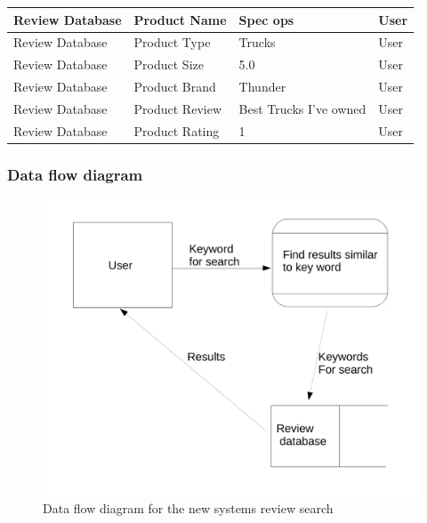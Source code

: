 \begin{center}
\begin{tabular}{|p{3cm}|p{3cm}|p{3cm}|p{3cm}|}
Review Database & Product Name & Spec ops & User\\ \hline 
Review Database & Product Type & Trucks & User \\ \hline
Review Database & Product Size & 5.0 & User \\ \hline
Review Database & Product Brand & Thunder & User \\ \hline
Review Database & Product Review & Best Trucks I've owned & User \\ \hline 
Review Database & Product Rating & 1 & User \\ \hline 





\end{tabular}
\label{tab:Proposed System Data Source and Destinations}
\end{center}












\subsubsection{Data flow diagram}


\begin{figure}[H]
    \includegraphics[width=\textwidth]{./Analysis/NewReviewSearch.pdf}
    \caption{Data flow diagram for the new systems review search} \label{fig:Review search}
\end{figure}



